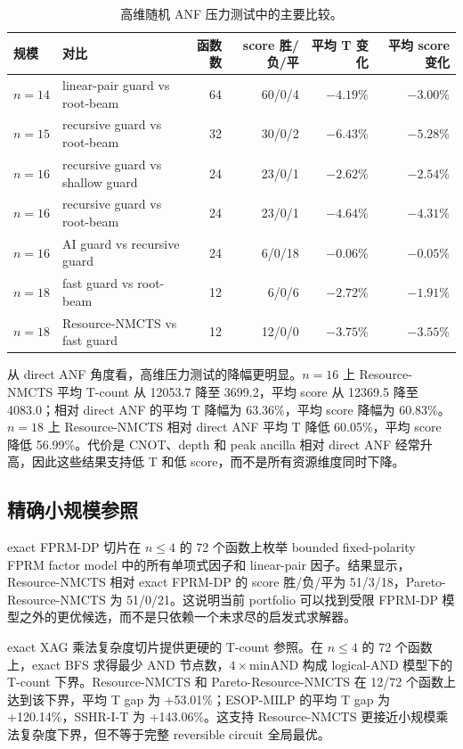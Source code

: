 \documentclass[UTF8,fontset=macnew,11pt]{ctexart}
\newcommand{\method}{Resource-NMCTS}
\newcommand{\pareto}{Pareto-Resource-NMCTS}
\begin{document}
\begin{table}[t]
\centering
\small
\caption{高维随机 ANF 压力测试中的主要比较。}
\label{tab:highdim}
\begin{tabular}{llrrrr}
\toprule
规模 & 对比 & 函数数 & score 胜/负/平 & 平均 T 变化 & 平均 score 变化 \\
\midrule
$n=14$ & linear-pair guard vs root-beam & 64 & 60/0/4 & $-4.19\%$ & $-3.00\%$ \\
$n=15$ & recursive guard vs root-beam & 32 & 30/0/2 & $-6.43\%$ & $-5.28\%$ \\
$n=16$ & recursive guard vs shallow guard & 24 & 23/0/1 & $-2.62\%$ & $-2.54\%$ \\
$n=16$ & recursive guard vs root-beam & 24 & 23/0/1 & $-4.64\%$ & $-4.31\%$ \\
$n=16$ & AI guard vs recursive guard & 24 & 6/0/18 & $-0.06\%$ & $-0.05\%$ \\
$n=18$ & fast guard vs root-beam & 12 & 6/0/6 & $-2.72\%$ & $-1.91\%$ \\
$n=18$ & \method{} vs fast guard & 12 & 12/0/0 & $-3.75\%$ & $-3.55\%$ \\
\bottomrule
\end{tabular}
\end{table}

从 direct ANF 角度看，高维压力测试的降幅更明显。$n=16$ 上 \method{} 平均 T-count 从 12053.7 降至 3699.2，平均 score 从 12369.5 降至 4083.0；相对 direct ANF 的平均 T 降幅为 63.36\%，平均 score 降幅为 60.83\%。$n=18$ 上 \method{} 相对 direct ANF 平均 T 降低 60.05\%，平均 score 降低 56.99\%。代价是 CNOT、depth 和 peak ancilla 相对 direct ANF 经常升高，因此这些结果支持低 T 和低 score，而不是所有资源维度同时下降。

\subsection{精确小规模参照}

exact FPRM-DP 切片在 $n\leq 4$ 的 72 个函数上枚举 bounded fixed-polarity FPRM factor model 中的所有单项式因子和 linear-pair 因子。结果显示，\method{} 相对 exact FPRM-DP 的 score 胜/负/平为 51/3/18，\pareto{} 为 51/0/21。这说明当前 portfolio 可以找到受限 FPRM-DP 模型之外的更优候选，而不是只依赖一个未求尽的启发式求解器。

exact XAG 乘法复杂度切片提供更硬的 T-count 参照。在 $n\leq 4$ 的 72 个函数上，exact BFS 求得最少 AND 节点数，$4\times \mathrm{minAND}$ 构成 logical-AND 模型下的 T-count 下界。\method{} 和 \pareto{} 在 12/72 个函数上达到该下界，平均 T gap 为 +53.01\%；ESOP-MILP 的平均 T gap 为 +120.14\%，SSHR-I-T 为 +143.06\%。这支持 \method{} 更接近小规模乘法复杂度下界，但不等于完整 reversible circuit 全局最优。
\end{document}
